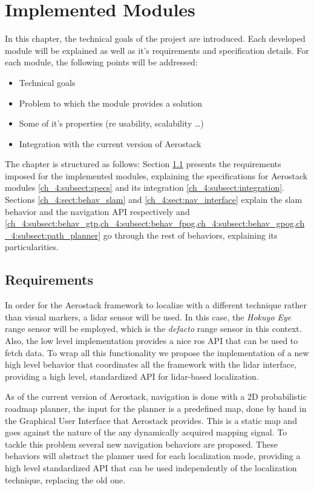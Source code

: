 \chapter{Implemented Modules} \label{ch_4:chapter}

In this chapter, the technical goals of the project are introduced. Each developed module will be explained as well as it's requirements and specification details. For each module, the following points will be addressed:

\begin{itemize}
  \item Technical goals
  \item Problem to which the module provides a solution
  \item Some of it's properties (re usability, scalability \dots)
  \item Integration with the current version of Aerostack
\end{itemize}

The chapter is structured as follows: Section \ref{ch_4:sect:requirements} presents the requirements imposed for the implemented modules, explaining the specifications for Aerostack modules \ref{ch_4:subsect:specs} and its integration \ref{ch_4:subsect:integration}. Sections \ref{ch_4:sect:behav_slam} and \ref{ch_4:sect:nav_interface} explain the slam behavior and the navigation API respectively and \cref{ch_4:subsect:behav_gtp,ch_4:subsect:behav_fpog,ch_4:subsect:behav_gpog,ch_4:subsect:path_planner} go through the rest of behaviors, explaining its particularities.

\section{Requirements} \label{ch_4:sect:requirements}

  In order for the Aerostack framework to localize with a different technique rather than visual markers, a lidar sensor will be used. In this case, the \textit{Hokuyo Eye} range sensor will be employed, which is the \textit{defacto} range sensor in this context. Also, the low level implementation provides a nice ros API that can be used to fetch data. To wrap all this functionality we propose the implementation of a new high level behavior that coordinates all the framework with the lidar interface, providing a high level, standardized API for lidar-based localization.

  As of the current version of Aerostack, navigation is done with a 2D probabilistic roadmap planner, the input for the planner is a predefined map, done by hand in the Graphical User Interface that Aerostack provides. This is a static map and goes against the nature of the any dynamically acquired mapping signal. To tackle this problem several new navigation behaviors are proposed. These behaviors will abstract the planner used for each localization mode, providing a high level standardized API that can be used independently of the localization technique, replacing the old one.

